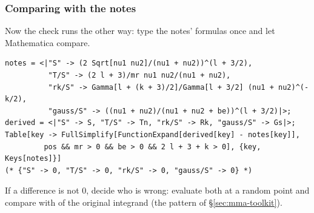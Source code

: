 \documentclass[11pt,a4paper]{article}
\numberwithin{equation}{section}
\theoremstyle{definition}
\theoremstyle{plain}
\theoremstyle{remark}
\numberwithin{algorithm}{section}
\begin{document}
\subsubsection{Comparing with the notes}
Now the check runs the other way: type the notes' formulas once and let Mathematica compare.
\begin{lstlisting}[style=wl]
notes = <|"S" -> (2 Sqrt[nu1 nu2]/(nu1 + nu2))^(l + 3/2),
          "T/S" -> (2 l + 3)/mr nu1 nu2/(nu1 + nu2),
          "rk/S" -> Gamma[l + (k + 3)/2]/Gamma[l + 3/2] (nu1 + nu2)^(-k/2),
          "gauss/S" -> ((nu1 + nu2)/(nu1 + nu2 + be))^(l + 3/2)|>;
derived = <|"S" -> S, "T/S" -> Tn, "rk/S" -> Rk, "gauss/S" -> Gs|>;
Table[key -> FullSimplify[FunctionExpand[derived[key] - notes[key]],
         pos && mr > 0 && be > 0 && 2 l + 3 + k > 0], {key, Keys[notes]}]
(* {"S" -> 0, "T/S" -> 0, "rk/S" -> 0, "gauss/S" -> 0} *)
\end{lstlisting}
If a difference is not $0$, decide who is wrong: evaluate both at a random point and compare with  of the original integrand (the  pattern of \S\ref{sec:mma-toolkit}).
\end{document}
